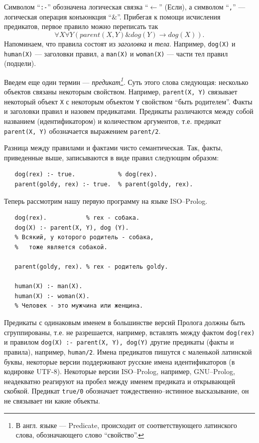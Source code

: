 \documentclass[12pt, openany, twoside]{book} %
\begin{document}
\noindent Символом ``{\tt :-}'' обозначена логическая связка ``$\leftarrow$'' (Если), а символом ``{\tt ,}'' --- логическая операция конъюнкция ``$\&$''. Прибегая к помощи исчисления предикатов, первое правило можно переписать так
$$
    \forall X \forall Y (parent(X, Y) \& dog(Y) \to dog(X)).
$$
Напоминаем, что правила состоят из {\em заголовка} и {\em тела}. Например, {\tt dog(X)} и {\tt human(X)} --- заголовки правил, а {\tt man(X)} и {\tt woman(X)} --- части тел правил (подцели).

Введем еще один термин --- {\em предикат\footnote{В англ. языке --- Predicate, происходит от соответствующего латинского слова, обозначающего слово ``свойство''.}.} Суть этого слова следующая: несколько объектов связаны некоторым свойством. Например, {\tt parent(X, Y)} связывает некоторый объект {\tt X} с некоторым объектом {\tt Y} свойством ``быть родителем''. Факты и заголовки правил и назовем предикатами. Предикаты различаются между собой названием (идентификатором) и количеством аргументов, т.е. предикат {\tt parent(X, Y)} обозначается выражением {\tt parent/2}.

Разница между правилами и фактами чисто семантическая. Так, факты, приведенные выше, записываются в виде правил следующим образом:
{\tt\begin{verbatim}
   dog(rex) :- true.            % dog(rex).
   parent(goldy, rex) :- true.  % parent(goldy, rex).
\end{verbatim}}

Теперь рассмотрим нашу первую программу на языке ISO--Prolog.
{\tt\begin{verbatim}
   dog(rex).           % rex - собака.
   dog(X) :- parent(X, Y), dog (Y).
   % Всякий, у которого родитель - собака,
   %   тоже является собакой.

   parent(goldy, rex). % rex - родитель goldy.

   human(Х) :- man(Х).
   human(Х) :- woman(Х).
   % Человек - это мужчина или женщина.
\end{verbatim}}
Предикаты с одинаковым именем в большинстве версий Пролога должны быть сгруппированы, т.е. не разрешается, например, вставлять между фактом {\tt dog(rex)} и правилом {\tt dog(X) :- parent(X, Y), dog(Y)} другие предикаты (факты и правила), например, {\tt human/2}. Имена предикатов пишутся с маленькой латинской буквы, некоторые версии поддерживают русские имена идентификаторов (в кодировке UTF-8). Некоторые версии ISO--Prolog, например, GNU--Prolog, неадекватно реагируют на пробел между именем предиката и открывающей скобкой.  Предикат {\tt true/0} обозначает тождественно--истинное высказывание, он не связывает ни какие объекты.
\end{document}
